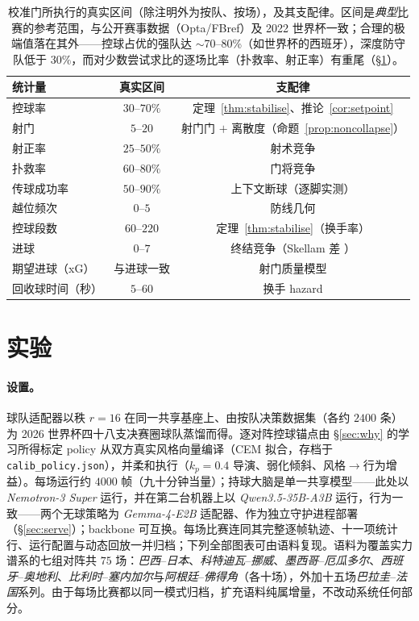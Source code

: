 \documentclass[11pt,UTF8,fontset=fandol]{ctexart}
\theoremstyle{plain}
\theoremstyle{definition}
\theoremstyle{remark}
\begin{document}
\begin{table}[h]\centering
\caption{校准门所执行的真实区间（除注明外为按队、按场），及其支配律。区间是\emph{典型}比赛的参考范围，与公开赛事数据（Opta/FBref）及 2022 世界杯一致；合理的极端值落在其外——控球占优的强队达 $\sim$70--80\%（如世界杯的西班牙），深度防守队低于 $30\%$，而对少数尝试求比的逐场比率（扑救率、射正率）有重尾（\S\ref{sec:exp}）。}
\label{tab:bands}
\small
\begin{tabular}{lcc}
\toprule
统计量 & 真实区间 & 支配律 \\
\midrule
控球率 & $30$--$70\%$ & 定理~\ref{thm:stabilise}、推论~\ref{cor:setpoint} \\
射门 & $5$--$20$ & 射门门 $+$ 离散度（命题~\ref{prop:noncollapse}） \\
射正率 & $25$--$50\%$ & 射术竞争 \\
扑救率 & $60$--$80\%$ & 门将竞争 \\
传球成功率 & $50$--$90\%$ & 上下文断球（逐脚实测） \\
越位频次 & $0$--$5$ & 防线几何 \\
控球段数 & $60$--$220$ & 定理~\ref{thm:stabilise}（换手率） \\
进球 & $0$--$7$ & 终结竞争（Skellam 差 \citep{skellam1946}） \\
期望进球（xG） & 与进球一致 & 射门质量模型 \\
回收球时间（秒） & $5$--$60$ & 换手 hazard \\
\bottomrule
\end{tabular}
\end{table}

\section{实验}\label{sec:exp}

\paragraph{设置。} 球队适配器以秩 $r=16$ 在同一共享基座上、由按队决策数据集（各约 $2400$ 条）为 2026 世界杯四十八支决赛圈球队蒸馏而得。逐对阵控球锚点由 \S\ref{sec:why} 的学习所得标定 policy 从双方真实风格向量编译（CEM 拟合，存档于 \texttt{calib\_policy.json}），并柔和执行（$k_p=0.4$ 导演、弱化倾斜、风格$\to$行为增益）。每场运行约 $4000$ 帧（九十分钟当量）；持球大脑是单一共享模型——此处以 \emph{Nemotron-3 Super} 运行，并在第二台机器上以 \emph{Qwen3.5-35B-A3B} 运行，行为一致——两个无球策略为 \emph{Gemma-4-E2B} 适配器、作为独立守护进程部署（\S\ref{sec:serve}）；backbone 可互换。每场比赛连同其完整逐帧轨迹、十一项统计行、运行配置与动态回放一并归档；下列全部图表可由语料复现。语料为覆盖实力谱系的七组对阵共 $75$ 场：\emph{巴西}--\emph{日本}、\emph{科特迪瓦}--\emph{挪威}、\emph{墨西哥}--\emph{厄瓜多尔}、\emph{西班牙}--\emph{奥地利}、\emph{比利时}--\emph{塞内加尔}与\emph{阿根廷}--\emph{佛得角}（各十场），外加十五场\emph{巴拉圭}--\emph{法国}系列。由于每场比赛都以同一模式归档，扩充语料纯属增量，不改动系统任何部分。
\end{document}
